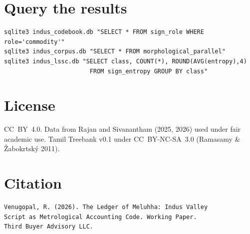 \documentclass[11pt]{article}
\begin{document}
\section{Query the results}

\begin{verbatim}
sqlite3 indus_codebook.db "SELECT * FROM sign_role WHERE role='commodity'"
sqlite3 indus_corpus.db "SELECT * FROM morphological_parallel"
sqlite3 indus_lssc.db "SELECT class, COUNT(*), ROUND(AVG(entropy),4)
                        FROM sign_entropy GROUP BY class"
\end{verbatim}

\section{License}

CC~BY~4.0. Data from Rajan and Sivanantham (2025, 2026) used
under fair academic use. Tamil Treebank v0.1 under
CC~BY-NC-SA~3.0 (Ramasamy \& \v{Z}abokrtsk\'{y} 2011).

\section{Citation}

\begin{verbatim}
Venugopal, R. (2026). The Ledger of Meluhha: Indus Valley
Script as Metrological Accounting Code. Working Paper.
Third Buyer Advisory LLC.
\end{verbatim}
\end{document}
